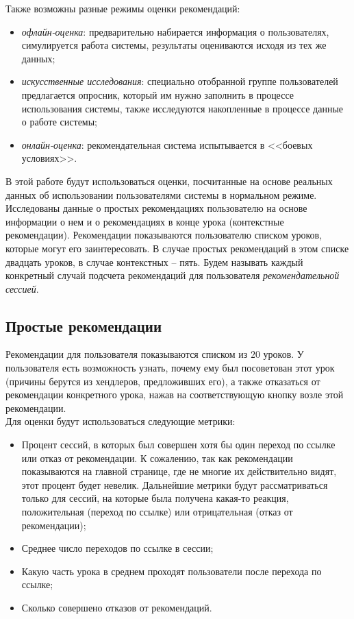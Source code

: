 \documentclass[12pt]{article}
\begin{document}
\indent Также возможны разные режимы оценки рекомендаций:
\begin{itemize}
    \item \textit{офлайн-оценка}: предварительно набирается информация о пользователях, симулируется работа системы, результаты оцениваются исходя из тех же данных;
    \item \textit{искусственные исследования}: специально отобранной группе пользователей предлагается опросник, который им нужно заполнить в процессе использования системы, также исследуются накопленные в процессе данные о работе системы;
    \item \textit{онлайн-оценка}: рекомендательная система испытывается в <<боевых условиях>>.
\end{itemize}

\indent В этой работе будут использоваться оценки, посчитанные на основе реальных данных об использовании пользователями системы в нормальном режиме. Исследованы данные о простых рекомендациях пользователю на основе информации о нем и о рекомендациях в конце урока (контекстные рекомендации). 
\indent Рекомендации показываются пользователю списком уроков, которые могут его заинтересовать. В случае простых рекомендаций в этом списке двадцать уроков, в случае контекстных -- пять. Будем называть каждый конкретный случай подсчета рекомендаций для пользователя \textit{рекомендательной сессией}.

\subsection{Простые рекомендации}
\indent Рекомендации для пользователя показываются списком из $20$ уроков. У пользователя есть возможность узнать, почему ему был посоветован этот урок (причины берутся из хендлеров, предложивших его), а также отказаться от рекомендации конкретного урока, нажав на соответствующую кнопку возле этой рекомендации. 
\\\indent Для оценки будут использоваться следующие метрики:

\begin{itemize}
    \item Процент сессий, в которых был совершен хотя бы один переход по ссылке или отказ от рекомендации. К сожалению, так как рекомендации показываются на главной странице, где не многие их действительно видят, этот процент будет невелик. Дальнейшие метрики будут рассматриваться только для сессий, на которые была получена какая-то реакция, положительная (переход по ссылке) или отрицательная (отказ от рекомендации);
    \item Среднее число переходов по ссылке в сессии;
    \item Какую часть урока в среднем проходят пользователи после перехода по ссылке;
    \item Сколько совершено отказов от рекомендаций.
\end{itemize}
\end{document}
